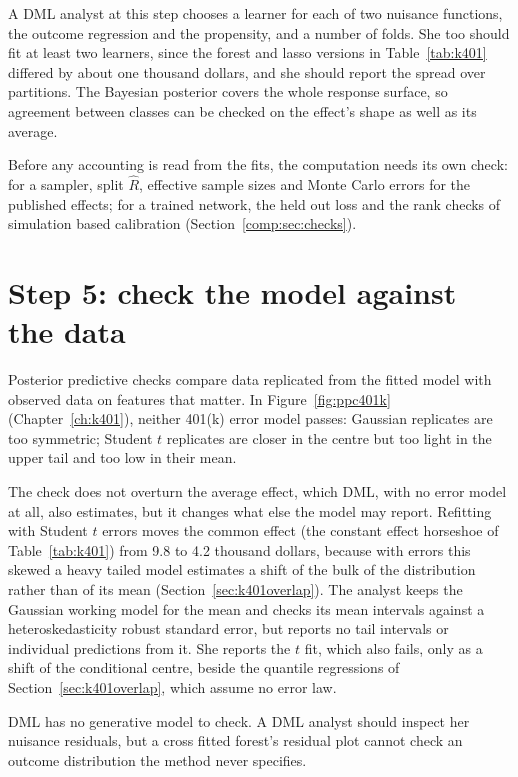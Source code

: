 A DML analyst at this step chooses a learner for each of two nuisance functions, the outcome regression and the propensity, and a number of folds. She too should fit at least two learners, since the forest and lasso versions in Table~\ref{tab:k401} differed by about one thousand dollars, and she should report the spread over partitions. The Bayesian posterior covers the whole response surface, so agreement between classes can be checked on the effect's shape as well as its average.

Before any accounting is read from the fits, the computation needs its own check: for a sampler, split $\hat R$, effective sample sizes and Monte Carlo errors for the published effects; for a trained network, the held out loss and the rank checks of simulation based calibration (Section~\ref{comp:sec:checks}). 

\section{Step 5: check the model against the data}

Posterior predictive checks compare data replicated from the fitted model with observed data on features that matter. In Figure~\ref{fig:ppc401k} (Chapter~\ref{ch:k401}), neither 401(k) error model passes: Gaussian replicates are too symmetric; Student $t$ replicates are closer in the centre but too light in the upper tail and too low in their mean.

The check does not overturn the average effect, which DML, with no error model at all, also estimates, but it changes what else the model may report. Refitting with Student $t$ errors moves the common effect (the constant effect horseshoe of Table~\ref{tab:k401}) from 9.8 to 4.2 thousand dollars, because with errors this skewed a heavy tailed model estimates a shift of the bulk of the distribution rather than of its mean (Section~\ref{sec:k401overlap}). The analyst keeps the Gaussian working model for the mean and checks its mean intervals against a heteroskedasticity robust standard error, but reports no tail intervals or individual predictions from it. She reports the $t$ fit, which also fails, only as a shift of the conditional centre, beside the quantile regressions of Section~\ref{sec:k401overlap}, which assume no error law.

DML has no generative model to check. A DML analyst should inspect her nuisance residuals, but a cross fitted forest's residual plot cannot check an outcome distribution the method never specifies.

